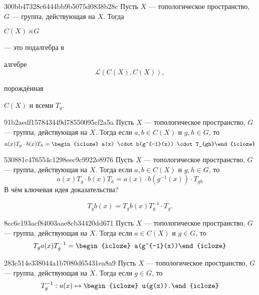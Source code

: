 \begin{note}{300bb47328c6444bb9b5075d0838b28c}
    Пусть \({ X }\) --- топологическое пространство, \({ G }\) --- группа, действующая на \({ X }\).
    Тогда \begin{icloze}{3}\({ C(X) \rtimes G }\)\end{icloze} --- это подалгебра в \begin{icloze}{2}алгебре
    \[
        \mathcal L(C(X), C(X)),
    \]
    \end{icloze} порождённая \begin{icloze}{1}\({ C(X) }\) и всеми \({ T_{g} }\).\end{icloze}
\end{note}

\begin{note}{91b2aedf157843449d78550095cf2a5a}
    Пусть \({ X }\) --- топологическое пространство, \({ G }\) --- группа, действующая на \({ X }\).
    Тогда если \({ a, b \in C(X) }\) и \({ g, h \in G }\), то
    \[
        a(x)T_{g} \cdot b(x) T_{h} = \begin{icloze}{1}a(x) \cdot b(g^{-1}(x)) \cdot T_{gh}\end{icloze}
    \]
\end{note}

\begin{note}{530881c476554c1298eec9c9922e8976}
    Пусть \({ X }\) --- топологическое пространство, \({ G }\) --- группа, действующая на \({ X }\).
    Тогда если \({ a, b \in C(X) }\) и \({ g, h \in G }\), то
    \[
        a(x)T_{g} \cdot b(x) T_{h} = a(x) \cdot b(g^{-1}(x)) \cdot T_{gh}
    \]
    В чём ключевая идея доказательства?

    \begin{cloze}{1}
        \[
            T_{g} b(x) = T_{g} b(x) T_{g}^{-1} \cdot T_{g}.
        \]
    \end{cloze}
\end{note}

\begin{note}{8cc6c193acf84003aae8cb34420dd671}
    Пусть \({ X }\) --- топологическое пространство, \({ G }\) --- группа, действующая на \({ X }\).
    Тогда если \({ a \in C(X) }\) и \({ g \in G }\), то
    \[
        T_{g} a(x) T_{g}^{-1} = \begin{icloze}{1}a(g^{-1}(x))\end{icloze}
    \]
\end{note}

\begin{note}{283c514e338044a1b7080d65431ea8a9}
    Пусть \({ X }\) --- топологическое пространство, \({ G }\) --- группа, действующая на \({ X }\).
    Тогда если \({ g \in G }\), то
    \[
        T_{g}^{-1} : u(x) \mapsto \begin{icloze}{1}u(g(x)).\end{icloze}
    \]
\end{note}

